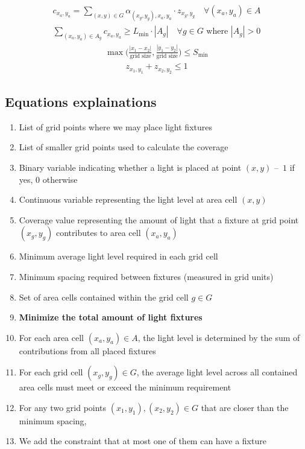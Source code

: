 \documentclass{article}
\begin{document}
\begin{align}
    c_{x_a, y_a} = \sum_{(x, y) \in G} \alpha_{(x_g, y_g), {x_a, y_a}} \cdot z_{x_g, y_g} \quad\forall (x_a, y_a) \in A
\end{align}
\begin{align}
    \sum_{(x_a, y_a) \in A_g} c_{x_a, y_a} \geq L_{\min} \cdot |A_g| \quad\forall g \in G \text{ where } |A_g| > 0
\end{align}
\begin{align}
    \max \bigg(\frac{|x_1 - x_2|}{\text{grid size}}, \frac{|y_1 - y_2|}{\text{grid size}}\bigg) \leq S_{\min}
\end{align}
\begin{align}
    z_{x_1, y_1} + z_{x_2, y_2} \leq 1
\end{align}

\newpage

\subsection{Equations explainations}

\begin{enumerate}
    \item List of grid points where we may place light fixtures
    \item List of smaller grid points used to calculate the coverage
    \item Binary variable indicating whether a light is placed at point $(x, y)$ – $1$ if yes, $0$ otherwise
    \item Continuous variable representing the light level at area cell $(x, y)$
    \item Coverage value representing the amount of light that a fixture at grid point $(x_g,y_g)$ contributes to area cell $(x_a,y_a)$
    \item Minimum average light level required in each grid cell
    \item Minimum spacing required between fixtures (measured in grid units)
    \item Set of area cells contained within the grid cell $g \in G$
    \item \textbf{Minimize the total amount of light fixtures}
    \item For each area cell $(x_a,y_a) \in A$, the light level is determined by the sum of contributions from all placed fixtures
    \item For each grid cell $(x_g,y_g) \in G$, the average light level across all contained area cells must meet or exceed the minimum requirement
    \item For any two grid points $(x_1,y_1), (x_2,y_2) \in G$ that are closer than the minimum spacing,
    \item We add the constraint that at most one of them can have a fixture
\end{enumerate}
\end{document}
